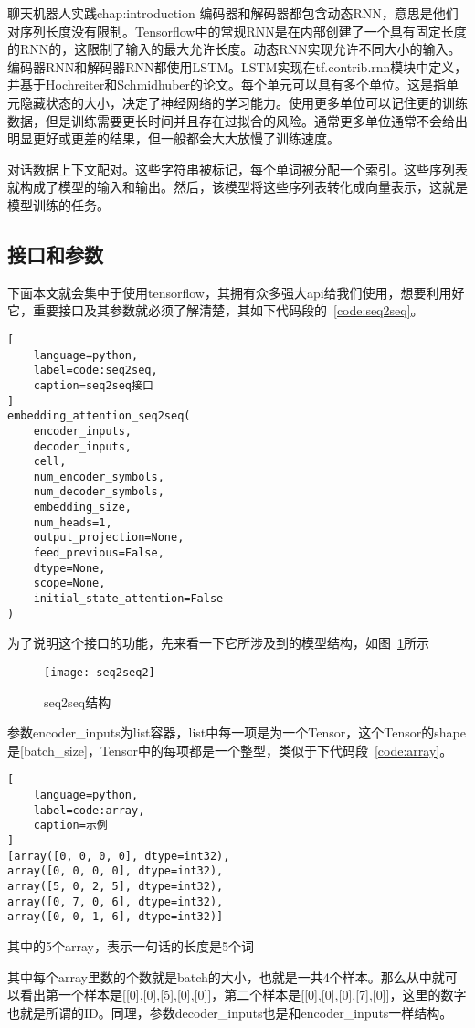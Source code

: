 \begin{cuzchapter}{聊天机器人实践}{chap:introduction}
编码器和解码器都包含动态RNN，意思是他们对序列长度没有限制。Tensorflow中的常规RNN是在内部创建了一个具有固定长度的RNN的，这限制了输入的最大允许长度。动态RNN实现允许不同大小的输入。编码器RNN和解码器RNN都使用LSTM。LSTM实现在tf.contrib.rnn模块中定义，并基于Hochreiter和Schmidhuber的论文\cite{Graves2012Long}。每个单元可以具有多个单位。这是指单元隐藏状态的大小，决定了神经网络的学习能力。使用更多单位可以记住更的训练数据，但是训练需要更长时间并且存在过拟合的风险。通常更多单位通常不会给出明显更好或更差的结果，但一般都会大大放慢了训练速度。

对话数据上下文配对。这些字符串被标记，每个单词被分配一个索引。这些序列表就构成了模型的输入和输出。然后，该模型将这些序列表转化成向量表示，这就是模型训练的任务。
\subsection{接口和参数}\label{sec:background}
下面本文就会集中于使用tensorflow，其拥有众多强大api给我们使用，想要利用好它，重要接口及其参数就必须了解清楚，其如下代码段的~\ref{code:seq2seq}。
\begin{lstlisting}[
    language=python,
    label=code:seq2seq,
    caption=seq2seq接口
]
embedding_attention_seq2seq(
    encoder_inputs,
    decoder_inputs,
    cell,
    num_encoder_symbols,
    num_decoder_symbols,
    embedding_size,
    num_heads=1,
    output_projection=None,
    feed_previous=False,
    dtype=None,
    scope=None,
    initial_state_attention=False
)
\end{lstlisting}

为了说明这个接口的功能，先来看一下它所涉及到的模型结构，如图~\ref{seq2seq2}所示
\begin{figure}[!htbp]
    \centering
    \texttt{[image: seq2seq2]}
    \caption[seq2seq2]{seq2seq结构}
    \label{seq2seq2}
\end{figure}

参数encoder\_inputs为list容器，list中每一项是为一个Tensor，这个Tensor的shape是[batch\_size]，Tensor中的每项都是一个整型，类似于下代码段~\ref{code:array}。
\begin{lstlisting}[
    language=python,
    label=code:array,
    caption=示例
]
[array([0, 0, 0, 0], dtype=int32), 
array([0, 0, 0, 0], dtype=int32), 
array([5, 0, 2, 5], dtype=int32), 
array([0, 7, 0, 6], dtype=int32), 
array([0, 0, 1, 6], dtype=int32)]
\end{lstlisting}

其中的5个array，表示一句话的长度是5个词

其中每个array里数的个数就是batch的大小，也就是一共4个样本。那么从中就可以看出第一个样本是[[0],[0],[5],[0],[0]]，第二个样本是[[0],[0],[0],[7],[0]]，这里的数字也就是所谓的ID。同理，参数decoder\_inputs也是和encoder\_inputs一样结构。


\end{cuzchapter}
